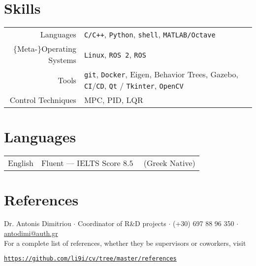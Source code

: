 \documentclass[a4paper,10pt,twoside]{article}
\begin{document}
\section{Skills}

\begin{tabular}{rp{12cm}}
Languages & \texttt{C/C++}, \texttt{Python}, \texttt{shell}, \texttt{MATLAB/Octave} \\
$\{$Meta-$\}$Operating Systems & \texttt{Linux}, \texttt{ROS 2}, \texttt{ROS} \\
  Tools & \texttt{git}, \texttt{Docker}, Eigen, Behavior Trees, Gazebo, \texttt{CI}/\texttt{CD}, \texttt{Qt} / \texttt{Tkinter}, \texttt{OpenCV} \\
Control Techniques & MPC, PID, LQR
\end{tabular}

\section{Languages}

\begin{tabular}{rp{12cm}}
  English & Fluent --- IELTS Score $8.5$ \ \ (Greek Native)
\end{tabular}

\vspace{0.2cm}

\section{References}
\noindent Dr. Antonis Dimitriou $\cdot$ Coordinator of R\&D projects $\cdot$ (+30) 697 88 96 350 $\cdot$ \href{mailto:antodimi@auth.gr}{antodimi@auth.gr} \\

\noindent For a complete list of references, whether they be supervisors or coworkers, visit
\begin{center}\noindent
\href{https://github.com/li9i/cv/tree/master/references}{\texttt{https://github.com/li9i/cv/tree/master/references}}
\end{center}
\end{document}
